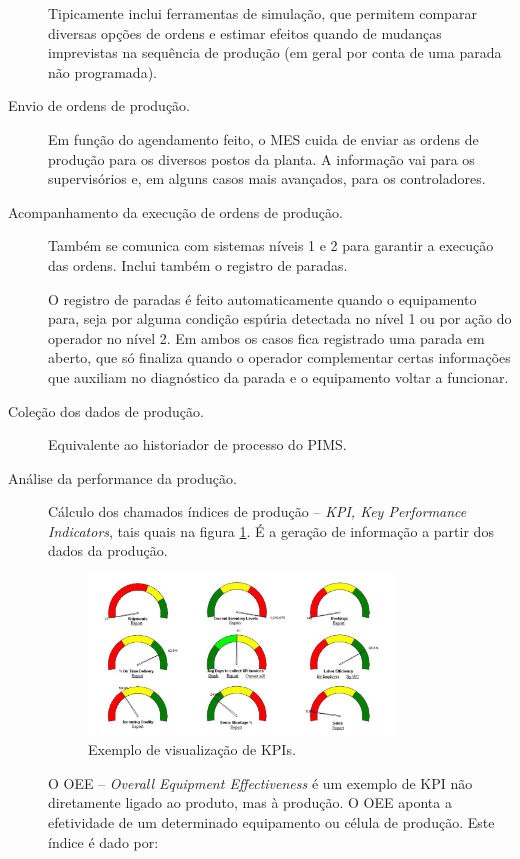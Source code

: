 \begin{description}
	Tipicamente inclui ferramentas de simulação, que permitem comparar diversas opções de ordens e estimar efeitos quando de mudanças imprevistas na sequência de produção (em geral por conta de uma parada não programada).

	\item[Envio de ordens de produção.] Em função do agendamento feito, o MES cuida de enviar as ordens de produção para os diversos postos da planta. A informação vai para os supervisórios e, em alguns casos mais avançados, para os controladores.
	\item[Acompanhamento da execução de ordens de produção.] Também se comunica com sistemas níveis 1 e 2 para garantir a execução das ordens. Inclui também o registro de paradas.

	O registro de paradas é feito automaticamente quando o equipamento para, seja por alguma condição espúria detectada no nível 1 ou por ação do operador no nível 2. Em ambos os casos fica registrado uma parada em aberto, que só finaliza quando o operador complementar certas informações que auxiliam no diagnóstico da parada e o equipamento voltar a funcionar.

	\item[Coleção dos dados de produção.] Equivalente ao historiador de processo do PIMS.
	\item[Análise da performance da produção.] Cálculo dos chamados índices de produção -- \emph{KPI, Key Performance Indicators}, tais quais na figura \ref{fig:kpi}. É a geração de informação a partir dos dados da produção.
\begin{figure}[hbt]
	\begin{center}
		\includegraphics[width=0.8\textwidth]{figuras/kpi}
	\end{center}
	\caption{Exemplo de visualização de KPIs.}
	\label{fig:kpi}
\end{figure}

	O OEE -- \emph{Overall Equipment Effectiveness} é um exemplo de KPI não diretamente ligado ao produto, mas à produção. O OEE aponta a efetividade de um determinado equipamento ou célula de produção. Este índice é dado por:


\end{description}
